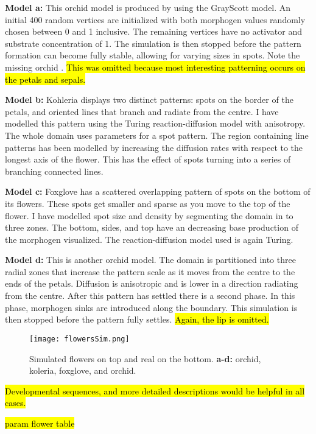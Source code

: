 \textbf{Model a:} 
This orchid model is produced by using the GrayScott model. An initial 400 random vertices are initialized with both morphogen values randomly chosen between 0 and 1 inclusive. The remaining vertices have no activator and substrate concentration of 1. The simulation is then stopped before the pattern formation can become fully stable, allowing for varying sizes in spots. Note the missing orchid . \hl{This was omitted because most interesting patterning occurs on the petals and sepals.}

\textbf{Model b:}
Kohleria displays two distinct patterns: spots on the border of the petals, and oriented lines that branch and radiate from the centre. I have modelled this pattern using the Turing reaction-diffusion model with anisotropy. The whole domain uses parameters for a spot pattern. The region containing line patterns has been modelled by increasing the diffusion rates with respect to the longest axis of the flower. This has the effect of spots turning into a series of branching connected lines.

\textbf{Model c:}
Foxglove has a scattered overlapping pattern of spots on the bottom of its flowers. These spots get smaller and sparse as you move to the top of the flower. I have modelled spot size and density by segmenting the domain in to three zones. The bottom, sides, and top have an decreasing base production of the morphogen visualized. The reaction-diffusion model used is again Turing.

\textbf{Model d:}
This is another orchid model. The domain is partitioned into three radial zones that increase the pattern scale as it moves from the centre to the ends of the petals. Diffusion is anisotropic and is lower in a direction radiating from the centre. After this pattern has settled there is a second phase. In this phase, morphogen sinks are introduced along the boundary. This simulation is then stopped before the pattern fully settles. \hl{Again, the lip is omitted.}

\begin{figure}[ht]
	\centering
	\texttt{[image: flowersSim.png]}
	\caption{Simulated flowers on top and real on the bottom. \textbf{a-d:} orchid, koleria, foxglove, and orchid.}
	\label{fig:orchids}
\end{figure}

\hl{Developmental sequences, and more detailed descriptions would be helpful in all cases.}

\hl{param flower table}

